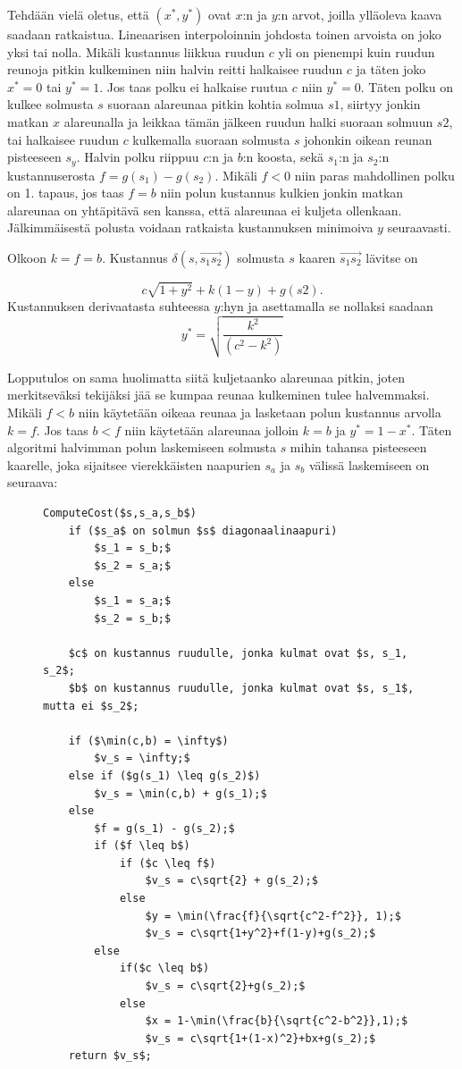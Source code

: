 \documentclass[finnish]{tktltiki2}
\theoremstyle{definition}
\theoremstyle{remark}
\begin{document}
Tehdään vielä oletus, että \((x^*, y^*)\) ovat \(x\):n ja \(y\):n arvot, joilla ylläoleva kaava saadaan ratkaistua. Lineaarisen interpoloinnin johdosta toinen arvoista on joko yksi tai nolla. Mikäli kustannus liikkua ruudun \(c\) yli on pienempi kuin ruudun reunoja pitkin kulkeminen niin halvin reitti halkaisee ruudun \(c\) ja täten joko \(x^* = 0\) tai \(y^* = 1\). Jos taas polku ei halkaise ruutua \(c\) niin \(y^* = 0\). Täten polku on kulkee solmusta \(s\) suoraan alareunaa pitkin kohtia solmua \(s1\), siirtyy jonkin matkan \(x\) alareunalla ja leikkaa tämän jälkeen ruudun halki suoraan solmuun \(s2\), tai halkaisee ruudun \(c\) kulkemalla suoraan solmusta \(s\) johonkin oikean reunan pisteeseen \(s_y\). Halvin polku riippuu \(c\):n ja \(b\):n koosta, sekä \(s_1\):n ja \(s_2\):n kustannuserosta \(f = g(s_1) - g(s_2)\). Mikäli \(f < 0\) niin paras mahdollinen polku on 1. tapaus, jos taas \(f = b\) niin polun kustannus kulkien jonkin matkan alareunaa on yhtäpitävä sen kanssa, että alareunaa ei kuljeta ollenkaan. Jälkimmäisestä polusta voidaan ratkaista kustannuksen minimoiva \(y\) seuraavasti.

Olkoon $k = f = b$. Kustannus $\delta(s, \overrightarrow{s_1s_2})$ solmusta $s$ kaaren $\overrightarrow{s_1s_2}$ lävitse on

\begin{equation}
	c\sqrt{1+y^2}+k(1-y)+g(s2).
\end{equation}
Kustannuksen derivaatasta suhteessa \(y\):hyn ja asettamalla se nollaksi saadaan
\[y^* = \sqrt{\frac{k^2}{(c^2-k^2)}}\]

Lopputulos on sama huolimatta siitä kuljetaanko alareunaa pitkin, joten merkitseväksi tekijäksi jää se kumpaa reunaa kulkeminen tulee halvemmaksi. Mikäli \(f < b\) niin käytetään oikeaa reunaa ja lasketaan polun kustannus arvolla \(k = f\). Jos taas \(b < f\) niin käytetään alareunaa jolloin \(k = b\) ja \(y^* = 1 - x^*\). Täten algoritmi halvimman polun laskemiseen solmusta \(s\) mihin tahansa pisteeseen kaarelle, joka sijaitsee vierekkäisten naapurien \(s_a\) ja \(s_b\) välissä laskemiseen on seuraava:

\begin{figure}[H]
\lstset{basicstyle=\footnotesize, tabsize=4}
\begin{lstlisting}[mathescape=true]
ComputeCost($s,s_a,s_b$)
	if ($s_a$ on solmun $s$ diagonaalinaapuri)
		$s_1 = s_b;$
		$s_2 = s_a;$
	else
		$s_1 = s_a;$
		$s_2 = s_b;$

	$c$ on kustannus ruudulle, jonka kulmat ovat $s, s_1, s_2$;
	$b$ on kustannus ruudulle, jonka kulmat ovat $s, s_1$, mutta ei $s_2$;

	if ($\min(c,b) = \infty$)
		$v_s = \infty;$
	else if ($g(s_1) \leq g(s_2)$)
		$v_s = \min(c,b) + g(s_1);$
	else
		$f = g(s_1) - g(s_2);$
		if ($f \leq b$)
			if ($c \leq f$)
				$v_s = c\sqrt{2} + g(s_2);$
			else
				$y = \min(\frac{f}{\sqrt{c^2-f^2}}, 1);$
				$v_s = c\sqrt{1+y^2}+f(1-y)+g(s_2);$
		else
			if($c \leq b$)
				$v_s = c\sqrt{2}+g(s_2);$
			else
				$x = 1-\min(\frac{b}{\sqrt{c^2-b^2}},1);$
				$v_s = c\sqrt{1+(1-x)^2}+bx+g(s_2);$
	return $v_s$;
\end{lstlisting}
\end{figure}
\end{document}
